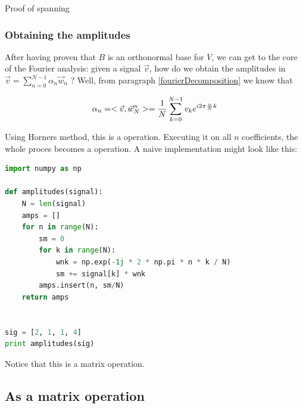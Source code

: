 Proof of spanning

\subsubsection{Obtaining the amplitudes}
After having proven that $B$ is an orthonormal base for $V$, we can get to the core of the Fourier analysis: given a signal $\vec{v}$, how do we obtain the amplitudes in $\vec{v} = \sum_{n=0}^{N-1} \alpha_n \vec{w}_n$ ? Well, from paragraph \ref{fourierDecomposition} we know that 

$$ \alpha_n = < \vec{v} , \vec{w}_N^n > = \frac{1}{N} \sum_{k=0}^{N-1} v_k e^{i 2\pi \frac{n}{N} k} $$

Using Horners method, this is a  operation. Executing it on all $n$ coefficients, the whole proces becomes a  operation. A naive implementation might look like this: 

\begin{lstlisting}[language=python]
import numpy as np

def amplitudes(signal):
    N = len(signal)
    amps = []
    for n in range(N):
        sm = 0
        for k in range(N):
            wnk = np.exp(-1j * 2 * np.pi * n * k / N) 
            sm += signal[k] * wnk
        amps.insert(n, sm/N)
    return amps


sig = [2, 1, 1, 4]
print amplitudes(sig)
\end{lstlisting}

Notice that this is a matrix operation. 


\subsection{As a matrix operation}

